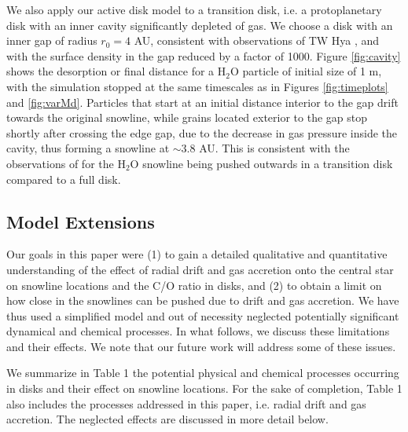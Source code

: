 \documentclass[apj]{emulateapj}
\begin{document}
We also apply our active disk model to a transition disk, i.e. a protoplanetary disk with an inner cavity significantly depleted of gas. We choose a disk with an inner gap of radius $r_0=4$ AU, consistent with observations of TW Hya \citep{zhang13}, and with the surface density in the gap reduced by a factor of 1000. Figure \ref{fig:cavity} shows the desorption or final distance for a H$_2$O particle of initial size of 1 m, with the simulation stopped at the same timescales as in Figures \ref{fig:timeplots} and \ref{fig:varMd}. Particles that start at an initial distance interior to the gap drift towards the original snowline, while grains located exterior to the gap stop shortly after crossing the edge gap, due to the decrease in gas pressure inside the cavity, thus forming a snowline at $\sim$$3.8$ AU. This is consistent with the observations of \citet{zhang13} for the H$_2$O snowline being pushed outwards in a transition disk compared to a full disk.  



\subsection{Model Extensions}
\label{sec:neglected}

Our goals in this paper were (1) to gain a detailed qualitative and quantitative understanding of the effect of radial drift and gas accretion onto the central star on snowline locations and the C/O ratio in disks, and (2) to obtain a limit on how close in the snowlines can be pushed due to drift and gas accretion. We have thus used a simplified model and out of necessity neglected potentially significant dynamical and chemical processes. In what follows, we discuss these limitations and their effects. We note that our future work will address some of these issues. 




We summarize in Table 1 the potential physical and chemical processes occurring in disks and their effect on snowline locations. For the sake of completion, Table 1 also includes the processes addressed in this paper, i.e. radial drift and gas accretion. The neglected effects are discussed in more detail below. 
\end{document}
